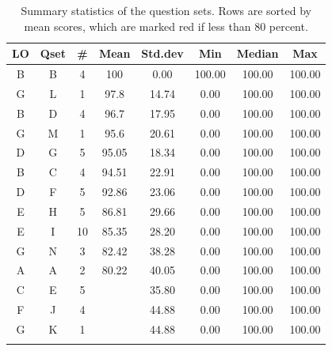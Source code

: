 \documentclass[12pt,english,nohyper]{tufte-handout}\usepackage[]{graphicx}\usepackage[]{color}
\begin{document}
\begin{fullwidth}
\makeatletter\setlength\hsize{\@tufte@fullwidth}\makeatother
\begin{longtable}{cc|ccc|ccc}
  \hline
LO & Qset & \# & Mean & Std.dev & Min & Median & Max \\ 
  \hline
B & B &   4 & 100 & 0.00 & 100.00 & 100.00 & 100.00 \\ 
  G & L &   1 & 97.8 & 14.74 & 0.00 & 100.00 & 100.00 \\ 
  B & D &   4 & 96.7 & 17.95 & 0.00 & 100.00 & 100.00 \\ 
  G & M &   1 & 95.6 & 20.61 & 0.00 & 100.00 & 100.00 \\ 
  D & G &   5 & 95.05 & 18.34 & 0.00 & 100.00 & 100.00 \\ 
  B & C &   4 & 94.51 & 22.91 & 0.00 & 100.00 & 100.00 \\ 
  D & F &   5 & 92.86 & 23.06 & 0.00 & 100.00 & 100.00 \\ 
  E & H &   5 & 86.81 & 29.66 & 0.00 & 100.00 & 100.00 \\ 
  E & I &  10 & 85.35 & 28.20 & 0.00 & 100.00 & 100.00 \\ 
  G & N &   3 & 82.42 & 38.28 & 0.00 & 100.00 & 100.00 \\ 
  A & A &   2 & 80.22 & 40.05 & 0.00 & 100.00 & 100.00 \\ 
  C & E &   5 & \color{red}{79.12} & 35.80 & 0.00 & 100.00 & 100.00 \\ 
  F & J &   4 & \color{red}{72.53} & 44.88 & 0.00 & 100.00 & 100.00 \\ 
  G & K &   1 & \color{red}{72.53} & 44.88 & 0.00 & 100.00 & 100.00 \\ 
   \hline
\hline
\caption{Summary statistics of the question sets. Rows are sorted by mean scores, which are marked red if less than 80 percent.} 
\label{tab:QuestionSet_summary}
\end{longtable}

\end{fullwidth}
\end{document}

